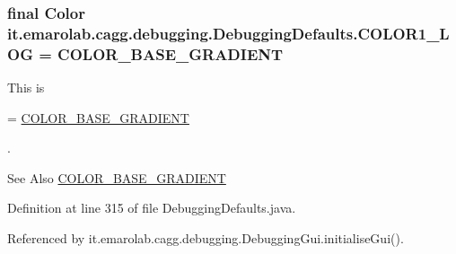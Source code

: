 \hypertarget{classit_1_1emarolab_1_1cagg_1_1debugging_1_1DebuggingDefaults_a9f7a16ba43783335336580b7566cf2d8}{
\subsubsection[{C\-O\-L\-O\-R1\-\_\-\-L\-O\-G}]{\setlength{\rightskip}{0pt plus 5cm}final Color it.\-emarolab.\-cagg.\-debugging.\-Debugging\-Defaults.\-C\-O\-L\-O\-R1\-\_\-\-L\-O\-G = {\bf C\-O\-L\-O\-R\-\_\-\-B\-A\-S\-E\-\_\-\-G\-R\-A\-D\-I\-E\-N\-T}\hspace{0.3cm}{\ttfamily [static]}}}\label{classit_1_1emarolab_1_1cagg_1_1debugging_1_1DebuggingDefaults_a9f7a16ba43783335336580b7566cf2d8}
This is
\begin{DoxyCode}
= \hyperlink{classit_1_1emarolab_1_1cagg_1_1debugging_1_1DebuggingDefaults_a17491ab8ed655381e8f8cc34e9d3b670}{COLOR\_BASE\_GRADIENT} 
\end{DoxyCode}
 . \begin{DoxySeeAlso}{See Also}
\hyperlink{classit_1_1emarolab_1_1cagg_1_1debugging_1_1DebuggingDefaults_a17491ab8ed655381e8f8cc34e9d3b670}{C\-O\-L\-O\-R\-\_\-\-B\-A\-S\-E\-\_\-\-G\-R\-A\-D\-I\-E\-N\-T} 
\end{DoxySeeAlso}


Definition at line 315 of file Debugging\-Defaults.\-java.



Referenced by it.\-emarolab.\-cagg.\-debugging.\-Debugging\-Gui.\-initialise\-Gui().

